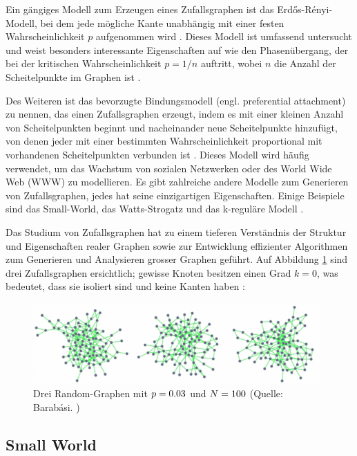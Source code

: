 Ein gängiges Modell zum Erzeugen eines Zufallsgraphen ist das Erdős-Rényi-Modell, bei dem jede mögliche Kante unabhängig mit einer festen Wahrscheinlichkeit $p$ aufgenommen wird \cite[p.~205 ff]{grimmett_random_nodate}.
Dieses Modell ist umfassend untersucht und weist besonders interessante Eigenschaften auf wie den Phasenübergang, der bei der kritischen Wahrscheinlichkeit $p = 1/n$ auftritt, wobei $n$ die Anzahl der Scheitelpunkte im Graphen ist \cite[p.~152]{bollobas_random_2001}.

Des Weiteren ist das bevorzugte Bindungsmodell (engl. preferential attachment) zu nennen, das einen Zufallsgraphen erzeugt, indem es mit einer kleinen Anzahl von Scheitelpunkten beginnt und nacheinander neue Scheitelpunkte hinzufügt, von denen jeder mit einer bestimmten Wahrscheinlichkeit proportional mit vorhandenen Scheitelpunkten verbunden ist \cite[p.~2f]{albert_diameter_1999}.
Dieses Modell wird häufig verwendet, um das Wachstum von sozialen Netzwerken oder des World Wide Web (WWW) zu modellieren.
Es gibt zahlreiche andere Modelle zum Generieren von Zufallsgraphen, jedes hat seine einzigartigen Eigenschaften. Einige Beispiele sind das Small-World, das Watts-Strogatz und das k-reguläre Modell \cite[p.~398f.]{newman_networks_2010}.

Das Studium von Zufallsgraphen hat zu einem tieferen Verständnis der Struktur und Eigenschaften realer Graphen sowie zur Entwicklung effizienter Algorithmen zum Generieren und Analysieren grosser Graphen geführt.
Auf Abbildung \ref{fig:random_graphs} sind drei Zufallsgraphen ersichtlich; gewisse Knoten besitzen einen Grad $k = 0$, was bedeutet, dass sie isoliert sind und keine Kanten haben \cite[p.~85]{barabasi_network_2016}:

\begin{figure}[H]
    \centering
    \includegraphics[width=11cm]{images/20_material_methods/random_graphs.png}
    \caption{Drei Random-Graphen mit $\protect p = 0.03$ und $\protect N = 100 $ (Quelle: Barabási. \cite[p.~84]{barabasi_network_2016})}
    \label{fig:random_graphs}
\end{figure}

\newpage
\subsection{Small World}

